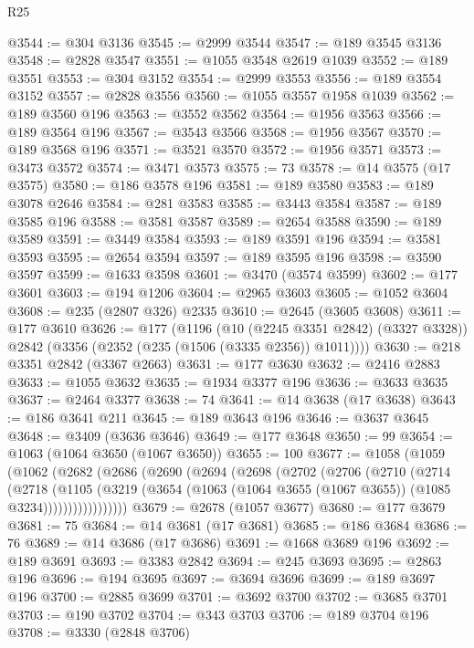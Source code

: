\begin{lexlean}{R25}
\begin{coremodule}
@3544 := @304 @3136
@3545 := @2999 @3544
@3547 := @189 @3545 @3136
@3548 := @2828 @3547
@3551 := @1055 @3548 @2619 @1039
@3552 := @189 @3551
@3553 := @304 @3152
@3554 := @2999 @3553
@3556 := @189 @3554 @3152
@3557 := @2828 @3556
@3560 := @1055 @3557 @1958 @1039
@3562 := @189 @3560 @196
@3563 := @3552 @3562
@3564 := @1956 @3563
@3566 := @189 @3564 @196
@3567 := @3543 @3566
@3568 := @1956 @3567
@3570 := @189 @3568 @196
@3571 := @3521 @3570
@3572 := @1956 @3571
@3573 := @3473 @3572
@3574 := @3471 @3573
@3575 := 73
@3578 := @14 @3575 (@17 @3575)
@3580 := @186 @3578 @196
@3581 := @189 @3580
@3583 := @189 @3078 @2646
@3584 := @281 @3583
@3585 := @3443 @3584
@3587 := @189 @3585 @196
@3588 := @3581 @3587
@3589 := @2654 @3588
@3590 := @189 @3589
@3591 := @3449 @3584
@3593 := @189 @3591 @196
@3594 := @3581 @3593
@3595 := @2654 @3594
@3597 := @189 @3595 @196
@3598 := @3590 @3597
@3599 := @1633 @3598
@3601 := @3470 (@3574 @3599)
@3602 := @177 @3601
@3603 := @194 @1206
@3604 := @2965 @3603
@3605 := @1052 @3604
@3608 := @235 (@2807 @326) @2335
@3610 := @2645 (@3605 @3608)
@3611 := @177 @3610
@3626 := @177
    (@1196
      (@10 (@2245 @3351 @2842) (@3327 @3328))
      @2842
      (@3356 (@2352 (@235 (@1506 (@3335 @2356)) @1011))))
@3630 := @218 @3351 @2842 (@3367 @2663)
@3631 := @177 @3630
@3632 := @2416 @2883
@3633 := @1055 @3632
@3635 := @1934 @3377 @196
@3636 := @3633 @3635
@3637 := @2464 @3377
@3638 := 74
@3641 := @14 @3638 (@17 @3638)
@3643 := @186 @3641 @211
@3645 := @189 @3643 @196
@3646 := @3637 @3645
@3648 := @3409 (@3636 @3646)
@3649 := @177 @3648
@3650 := 99
@3654 := @1063 (@1064 @3650 (@1067 @3650))
@3655 := 100
@3677 := @1058
    (@1059
      (@1062
        (@2682
          (@2686
            (@2690
              (@2694
                (@2698
                  (@2702
                    (@2706
                      (@2710
                        (@2714
                          (@2718
                            (@1105
                              (@3219
                                (@3654
                                  (@1063 (@1064 @3655 (@1067 @3655)) (@1085 @3234)))))))))))))))))
@3679 := @2678 (@1057 @3677)
@3680 := @177 @3679
@3681 := 75
@3684 := @14 @3681 (@17 @3681)
@3685 := @186 @3684
@3686 := 76
@3689 := @14 @3686 (@17 @3686)
@3691 := @1668 @3689 @196
@3692 := @189 @3691
@3693 := @3383 @2842
@3694 := @245 @3693
@3695 := @2863 @196
@3696 := @194 @3695
@3697 := @3694 @3696
@3699 := @189 @3697 @196
@3700 := @2885 @3699
@3701 := @3692 @3700
@3702 := @3685 @3701
@3703 := @190 @3702
@3704 := @343 @3703
@3706 := @189 @3704 @196
@3708 := @3330 (@2848 @3706)

\end{coremodule}
\end{lexlean}
